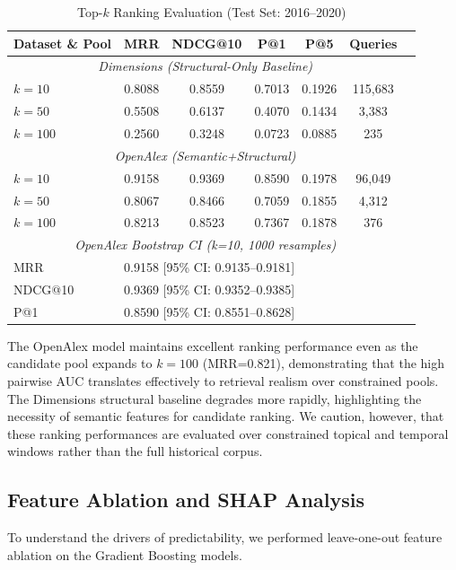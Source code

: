 \documentclass[11pt,a4paper]{article}
\begin{document}
\begin{table}[H]
\centering
\caption{Top-$k$ Ranking Evaluation (Test Set: 2016--2020)}
\label{tab:ranking}
\begin{tabular}{lcccccc}
\toprule
\textbf{Dataset \& Pool} & \textbf{MRR} & \textbf{NDCG@10} & \textbf{P@1} & \textbf{P@5} & \textbf{Queries} \\
\midrule
\multicolumn{6}{c}{\textit{Dimensions (Structural-Only Baseline)}} \\
$k=10$ & 0.8088 & 0.8559 & 0.7013 & 0.1926 & 115,683 \\
$k=50$ & 0.5508 & 0.6137 & 0.4070 & 0.1434 & 3,383 \\
$k=100$ & 0.2560 & 0.3248 & 0.0723 & 0.0885 & 235 \\
\midrule
\multicolumn{6}{c}{\textit{OpenAlex (Semantic+Structural)}} \\
$k=10$ & 0.9158 & 0.9369 & 0.8590 & 0.1978 & 96,049 \\
$k=50$ & 0.8067 & 0.8466 & 0.7059 & 0.1855 & 4,312 \\
$k=100$ & 0.8213 & 0.8523 & 0.7367 & 0.1878 & 376 \\
\midrule
\multicolumn{6}{c}{\textit{OpenAlex Bootstrap CI (k=10, 1000 resamples)}} \\
MRR & \multicolumn{5}{l}{0.9158 [95\% CI: 0.9135--0.9181]} \\
NDCG@10 & \multicolumn{5}{l}{0.9369 [95\% CI: 0.9352--0.9385]} \\
P@1 & \multicolumn{5}{l}{0.8590 [95\% CI: 0.8551--0.8628]} \\
\bottomrule
\end{tabular}
\end{table}

The OpenAlex model maintains excellent ranking performance even as the candidate pool expands to $k=100$ (MRR=0.821), demonstrating that the high pairwise AUC translates effectively to retrieval realism over constrained pools. The Dimensions structural baseline degrades more rapidly, highlighting the necessity of semantic features for candidate ranking. We caution, however, that these ranking performances are evaluated over constrained topical and temporal windows rather than the full historical corpus.

\subsection{Feature Ablation and SHAP Analysis}
\label{sec:ablation}
To understand the drivers of predictability, we performed leave-one-out feature ablation on the Gradient Boosting models.
\end{document}
